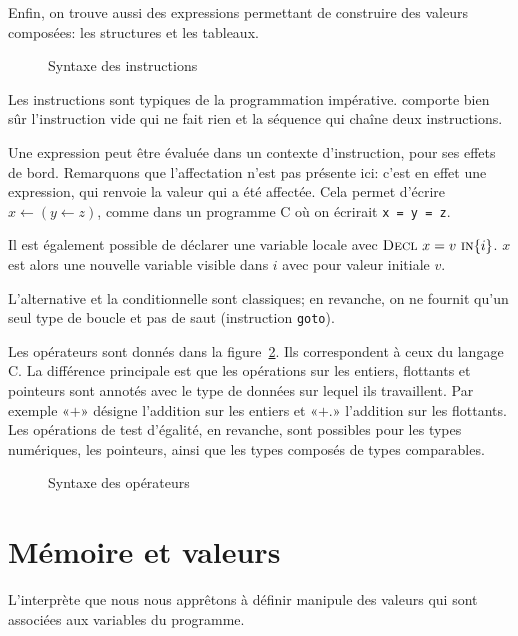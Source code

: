 Enfin, on trouve aussi des expressions permettant de construire des valeurs
composées: les structures et les tableaux.

\begin{figure}%

  \figstxinstr{}

  \caption{Syntaxe des instructions}
\label{fig:stx}
\end{figure}%

Les instructions sont typiques de la programmation impérative. \langname
comporte bien sûr l'instruction vide qui ne fait rien et la séquence qui chaîne
deux instructions.

Une expression peut être évaluée dans un contexte d'instruction, pour ses effets
de bord. Remarquons que l'affectation n'est pas présente ici: c'est en effet une
expression, qui renvoie la valeur qui a été affectée. Cela permet d'écrire $x ←
(y ← z)$, comme dans un programme C où on écrirait \texttt{x = y = z}.

Il est également possible de déclarer une variable locale avec
$\textsc{Decl}~x=v~\textsc{in}\{i\}$. $x$ est alors une nouvelle variable visible dans $i$ avec
pour valeur initiale $v$.

L'alternative et la conditionnelle sont classiques; en revanche, on ne fournit
qu'un seul type de boucle et pas de saut (instruction \texttt{goto}).

Les opérateurs sont donnés dans la figure~\ref{fig:stx-ops}. Ils correspondent
à ceux du langage C. La différence principale est que les opérations sur les
entiers, flottants et pointeurs sont annotés avec le type de données sur lequel
ils travaillent. Par exemple «$+$» désigne l'addition sur les entiers et «$+.$»
l'addition sur les flottants. Les opérations de test d'égalité, en revanche,
sont possibles pour les types numériques, les pointeurs, ainsi que les
types composés de types comparables.

\begin{figure}[h]%

  \figstxops{}

  \caption{Syntaxe des opérateurs}
\label{fig:stx-ops}
\end{figure}%

\section{Mémoire et valeurs}

L'interprète que nous nous apprêtons à définir manipule des valeurs qui sont
associées aux variables du programme.

